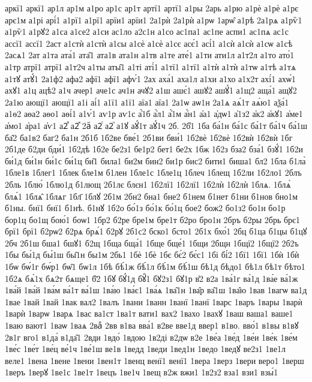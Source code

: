 {аркї1
аркї1
ар1л
ар1м
а1ро
ар1с
ар1т
артї1
артї1
а1ры
2арь
а1рю
а1рѐ
а1рѐ
а1рє
арє1м
а1рі
арі́1
а1рї1
а1рї1
арїи1
арїи1
2а1рѝ
2а1рѝ
а1рѡ
1арѡ̑
а1рѣ
2а1рѧ
а1рѷ1
а1рѷ1
а1рꙋ2
а1са
а1се2
а1си
ас1ло
а2с1н
а1со
ас1па1
ас1пе
аспи1
ас1пѧ
ас1с
ассї1
ассї1
2аст
а1стѝ
а1стѝ
а1сы
а1сѐ
а1сѐ
а1сє
асє́1
асі́1
а1сѝ
а1сѝ
а1сѡ
а1сѣ
2асѧ1
2ат
а1та
ата́1
ата̑1
ата1в
ата1н
а1тв
а1те
ате́1
а1ти
ати1л
а1т2л
а1то
ато́1
а1тр
атрї1
атрї1
а1т2ч
а1ты
аты̑1
а1ті
аті́1
а1тї1
а1тї1
а1тѝ
а1тѝ
а1тѡ
а1тѣ
а1тѧ
а1тꙋ
атꙋ́1
2а1ф2
афа2
афї1
афї1
афѵ́1
2ах
аха́1
аха1л
а1хи
а1хо
а1х2т
ахі́1
ахѡ́1
ахꙋ1
а1ц
ацѣ2
а1ч
ачер1
аче1с
ач1н
ачꙋ2
а1ш
ашє́1
ашꙋ2
ашꙋ́1
а1щ2
аща́1
ащꙋ2
2а1ю
ающї1
ающї1
а1і
аі́1
а1ї1
а1ї1
аїа1
аїа1
2а1ѡ
аѡ1н
2а1ѧ
аѧ́1т
аѧ́ю1
аѯа́1
а1ѳ2
аѳа2
аѳо1
аѳі́1
а1ѵ́1
аѵ1р
аѵ1с
а҆́1б
а҆́л1
а҆́1м
а҆́н1
а҆а1
а҆дѡ1
а҆1з2
а҆к2
а҆кꙋ1
а҆ме1
а҆мо1
а҆ра1
а҆ѵ1
а2ⷡ
а2ⷤ
2аⷩ
а2ⷭ
а2ⷱ
а1ꙋ
аꙋ́1т
аꙋ́1ч
2б.
2б̾1
1ба
ба́1н
ба́1с
ба́1т
ба́1ч
ба́1ш
ба̑2
ба1в2
баг2
ба1н
2б1б
1б2ве
бве́1
2б1ви
бви́1
1б2вѐ
1б2вѐ
1б2вѝ
1б2вѝ
1бг
2б1де
б2ди
бди́1
1б2дѣ
1б2е
бе2з1
бе1р2
бет1
бе2х
1бж
1б2з
бза2
бза́1
бзꙋ́1
1б2и
би́1д
би́1н
би́1с
би́1ц
би̑1
била1
би2м
бин2
би1р
бис2
бити1
биша1
бл2
1бла
б1ла̀
1бле1в
1блег1
1блек
бле1м
б1лен
1бле1с
1бле1ц
1блеч
1блещ
1б2ли
1б2ло1
2блъ
2бль
1блю́
1блю1д
б1лющ
2б1лє
блєн1
1б2лї1
1б2лї1
1б2лѝ
1б2лѝ
1блѧ.
1блѧ̀
блѧ́1
1блѧ̑
1блѧг
1бл҃
1блꙋ
2б1м
2бн2
бна1
бне2
б1нем
б1нет
б1ни
б1нов
бно1м
б1ны.
бнї1
бнї1
б1нѣ.
б1нꙋ
1б2о
бо́1з
бо́1к
бо́1ц
бое2
бож2
бо1з2
бо1н
бо1р
бор1ц
бо1щ
бою́1
боѡ1
1бр2
б2ре
бре1м
бре1т
б2ро
бро1н
2бръ
б2ры
2брь
брє1
брї1
брї1
б2рѡ2
б2рѧ
брѧ́1
б2рꙋ
2б1с2
бско1
бсто1
2б1х
бхо́1
2бц
б1ца
б1цы
б1цꙋ
2бч
2б1ш
бша1
бшꙋ1
б2щ
1бща
бща́1
1бще
бще́1
1бщи
2бщн
1бщї2
1бщї2
2б2ъ
1бы
бы́1д
бы́1ш
бы̑1н
бы1м
2бь1
1бѐ
1бѐ
1бє
бє́2
бє́с1
1бі
бі́2
1бї1
1бї1
1бѝ
1бѝ
1бѡ
бѡ́1г
бѡ́р1
бѡ̑1
бѡ1л
1бѣ
бѣ́1ж
бѣ́1л
бѣ́1м
бѣ́1ш
бѣ1д
бѣдо1
бѣ1л
бѣ1т
бѣто1
1б2ѧ
бѧ́1х
бѧ2т
бѧще1
б҃2
1бꙋ
бꙋ́1д
бꙋ̑1
бꙋ2з1
бꙋ1р
в̾2
в2а
1ва́1г
ва́1д
1ва́е
ва́1ж
1ва́й
1ва́й
1ва́м
ва́1т
ва́1ш
1ва́ю
1ва́є1
1ва́ѧ
1ва̑1н
1ва̑р
ва̑1ш
1ва̑ю
1вав
1вагѡ
ва1д
1вае
1вай
1вай
1вак
вал2
1валъ
1вани
1ванн
1ванї
1ванї
1варс
1варъ
1вары
1варѝ
1варѝ
1варѡ
1варѧ
1вас
ва1ст
1ва1т
вати1
вах2
1вахо
1вахꙋ
1ваш
ваша1
ваше1
1ваю
вают1
1ваѡ
1ваѧ
2ваⷤ
2вв
в1ва
вва́1
в2ве
вве1д
ввер1
в1во.
вво́1
в1вы
в1вꙋ
2в1г
вго1
в1да́
в1да̑1
2вди
1вдо́
1вдою
1в2ді
в2дѡ
в2е
1ве́а
1ве́д
1ве́и
1ве́к
1ве́м
1ве́с
1ве́т
1ве́ц
ве́1ч
1ве́1ш
ве1в
1ведд
1веди
1вед1н
1ведо
1ведꙋ
ве2з1
1ве1л
веле1
1вена
1вене
1вени
1вен1т
1венц
венї1
венї1
1вера
1верз
1вери
веро1
1верш
1веръ
1верꙋ
1ве1с
1ве1т
1вецъ
1ве1ч
1вещ
в2ж
вжи1
1в2з2
вза1
взи1
взы́1
}
